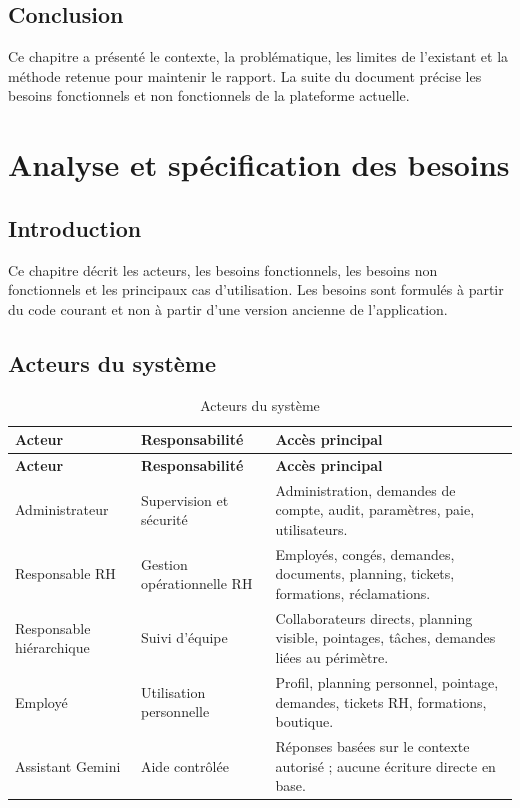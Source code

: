 \documentclass[12pt,a4paper]{report}
\begin{document}
\section{Conclusion}
Ce chapitre a présenté le contexte, la problématique, les limites de l'existant et la méthode retenue pour maintenir le rapport. La suite du document précise les besoins fonctionnels et non fonctionnels de la plateforme actuelle.

\chapter{Analyse et spécification des besoins}
\section{Introduction}
Ce chapitre décrit les acteurs, les besoins fonctionnels, les besoins non fonctionnels et les principaux cas d'utilisation. Les besoins sont formulés à partir du code courant et non à partir d'une version ancienne de l'application.

\section{Acteurs du système}

\begin{longtable}{>{\raggedright\arraybackslash}p{3cm}>{\raggedright\arraybackslash}p{5cm}>{\raggedright\arraybackslash}p{6cm}}
\caption{Acteurs du système}\label{tab:acteurs}\\
\toprule
\textbf{Acteur} & \textbf{Responsabilité} & \textbf{Accès principal} \\
\midrule
\endfirsthead
\toprule
\textbf{Acteur} & \textbf{Responsabilité} & \textbf{Accès principal} \\
\midrule
\endhead
Administrateur & Supervision et sécurité & Administration, demandes de compte, audit, paramètres, paie, utilisateurs. \\
Responsable RH & Gestion opérationnelle RH & Employés, congés, demandes, documents, planning, tickets, formations, réclamations. \\
Responsable hiérarchique & Suivi d'équipe & Collaborateurs directs, planning visible, pointages, tâches, demandes liées au périmètre. \\
Employé & Utilisation personnelle & Profil, planning personnel, pointage, demandes, tickets RH, formations, boutique. \\
Assistant Gemini & Aide contrôlée & Réponses basées sur le contexte autorisé ; aucune écriture directe en base. \\
\bottomrule
\end{longtable}
\end{document}
